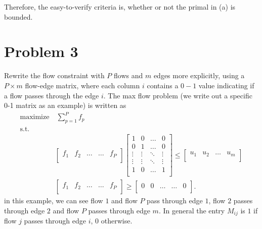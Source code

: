 \documentclass[12pt]{article}
\begin{document}
Therefore, the easy-to-verify criteria is, whether or not the primal in (a) is bounded.

\newpage
\section*{Problem 3}
Rewrite the flow constraint with $P$ flows and $m$ edges more explicitly, using a $P\times m$ flow-edge matrix, where each column $i$ contains a $0-1$ value indicating if a flow passes through the edge $i$. The max flow problem (we write out a specific 0-1 matrix as an example) is written as
\begin{align*}
\text{maximize} &~ \sum_{p=1}^P f_p\\
\text{s.t.}& ~  \\
&\begin{bmatrix}
	f_1 & f_2 & \dots & \dots & f_P \\
\end{bmatrix}
\begin{bmatrix}
1 & 0 & \dots & 0 \\
0 & 1 & \dots & 0 \\
\vdots & \vdots & \ddots & \vdots \\
\vdots & \vdots & \ddots & \vdots \\
1 & 0 & \dots & 1 \\
\end{bmatrix} \leq 
\begin{bmatrix}
u_1 & u_2  & \dots & u_m \\
\end{bmatrix}\\
&\begin{bmatrix}
f_1 & f_2 & \dots & \dots & f_P \\
\end{bmatrix} \geq 
\begin{bmatrix}
0 & 0 & \dots & \dots & 0 \\
\end{bmatrix}.
\end{align*}
in this example, we can see flow $1$ and flow $P$ pass through edge $1$, flow $2$ passes through edge $2$ and flow $P$ passes through edge $m$. In general the entry $M_{ij}$ is $1$ if flow $j$ passes through edge $i$, $0$ otherwise.
\end{document}
